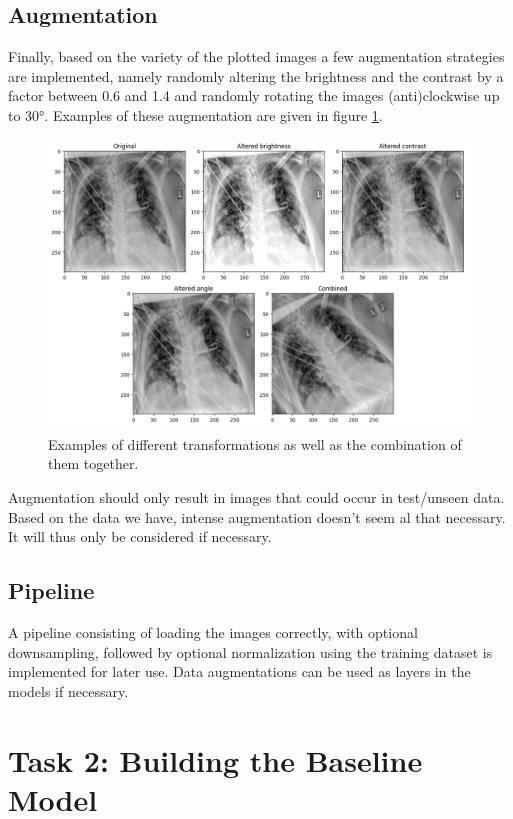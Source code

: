 \documentclass[conference]{IEEEtran}
\begin{document}
\subsection{Augmentation}
Finally, based on the variety of the plotted images a few augmentation strategies are implemented, namely randomly altering the brightness and the contrast by a factor between 0.6 and 1.4 and randomly rotating the images (anti)clockwise up to 30°. Examples of these augmentation are given in figure \ref{fig:augmentation}.

\begin{figure}[htbp]
\centerline{\includegraphics[width=\linewidth]{Images/augmentation.png}}
\caption{Examples of different transformations as well as the combination of them together.}
\label{fig:augmentation}
\end{figure}

Augmentation should only result in images that could occur in test/unseen data. Based on the data we have, intense augmentation doesn't seem al that necessary. It will thus only be considered if necessary.

\subsection{Pipeline}
A pipeline consisting of loading the images correctly, with optional downsampling, followed by optional normalization using the training dataset is implemented for later use. Data augmentations can be used as layers in the models if necessary.








\section{Task 2: Building the Baseline Model}
\end{document}
